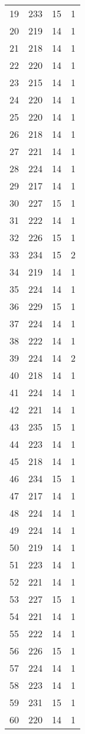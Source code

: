 \begin{longtable}[!]{c|ccc}
	19	& 233	& 15	& 1	\\
	20	& 219	& 14	& 1	\\
	21	& 218	& 14	& 1	\\
	22	& 220	& 14	& 1	\\
	23	& 215	& 14	& 1	\\
	24	& 220	& 14	& 1	\\
	25	& 220	& 14	& 1	\\
	26	& 218	& 14	& 1	\\
	27	& 221	& 14	& 1	\\
	28	& 224	& 14	& 1	\\
	29	& 217	& 14	& 1	\\
	30	& 227	& 15	& 1	\\
	31	& 222	& 14	& 1	\\
	32	& 226	& 15	& 1	\\
	33	& 234	& 15	& 2	\\
	34	& 219	& 14	& 1	\\
	35	& 224	& 14	& 1	\\
	36	& 229	& 15	& 1	\\
	37	& 224	& 14	& 1	\\
	38	& 222	& 14	& 1	\\
	39	& 224	& 14	& 2	\\
	40	& 218	& 14	& 1	\\
	41	& 224	& 14	& 1	\\
	42	& 221	& 14	& 1	\\
	43	& 235	& 15	& 1	\\
	44	& 223	& 14	& 1	\\
	45	& 218	& 14	& 1	\\
	46	& 234	& 15	& 1	\\
	47	& 217	& 14	& 1	\\
	48	& 224	& 14	& 1	\\
	49	& 224	& 14	& 1	\\
	50	& 219	& 14	& 1	\\
	51	& 223	& 14	& 1	\\
	52	& 221	& 14	& 1	\\
	53	& 227	& 15	& 1	\\
	54	& 221	& 14	& 1	\\
	55	& 222	& 14	& 1	\\
	56	& 226	& 15	& 1	\\
	57	& 224	& 14	& 1	\\
	58	& 223	& 14	& 1	\\
	59	& 231	& 15	& 1	\\
	60	& 220	& 14	& 1	\\

\end{longtable}
